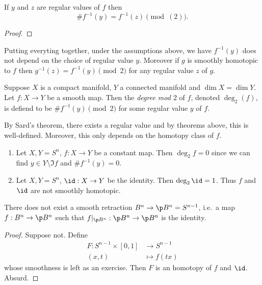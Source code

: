 \documentclass[a4paper]{article}
\begin{document}
\begin{theorem}
  If \(y\) and \(z\) are regular values of \(f\) then
  \[
    \# f^{-1}(y) = f^{-1}(z) \pmod (2).
  \]
\end{theorem}

\begin{proof}
  \blindtext
\end{proof}

Putting everyting together, under the assumptions above, we have \(f^{-1}(y)\) does not depend on the choice of regular value \(y\). Moreover if \(g\) is smoothly homotopic to \(f\) then \(g^{-1}(z) = f^{-1}(y) \pmod 2\) for any regular value \(z\) of \(g\).

\begin{definition}
  Suppose \(X\) is a compact manifold, \(Y\) a connected manifold and \(\dim X = \dim Y\). Let \(f: X \to Y\) be a smooth map. Then the \emph{degree mod \(2\)} of \(f\), denoted \(\deg_2(f)\), is defiend to be \(\# f^{-1}(y) \pmod 2\) for some regular value \(y\) of \(f\).
\end{definition}

By Sard's theorem, there exists a regular value and by theorems above, this is well-defined. Moreover, this only depends on the homotopy class of \(f\).

\begin{eg}\leavevmode
  \begin{enumerate}
  \item Let \(X, Y = S^n\), \(f: X \to Y\) be a constant map. Then \(\deg_2 f = 0\) since we can find \(y \in Y \setminus \Im f\) and \(\# f^{-1}(y) = 0\).
  \item Let \(X, Y = S^n\), \(\id: X \to Y\) be the identity. Then \(\deg_2 \id = 1\). Thus \(f\) and \(\id\) are not smoothly homotopic.
  \end{enumerate}
\end{eg}

\begin{corollary}
  There does not exist a smooth retraction \(B^n \to \p B^n= S^{n - 1}\), i.e.\ a map \(f: B^n \to \p B^n\) such that \(f|_{\p B^n}: \p B^n \to \p B^n\) is the identity.
\end{corollary}

\begin{proof}
  Suppose not. Define
  \begin{align*}
    F: S^{n - 1} \times [0, 1] &\to S^{n - 1} \\
    (x, t) &\mapsto f(tx)
  \end{align*}
  whose smoothness is left as an exercise. Then \(F\) is an homotopy of \(f\) and \(\id\). Absurd.
\end{proof}
\end{document}
